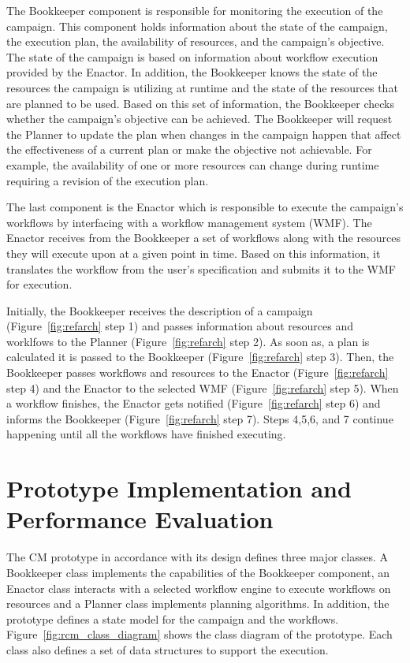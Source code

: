 The Bookkeeper component is responsible for monitoring the execution of the 
campaign. This component holds information about the state of the campaign, 
the execution plan, the availability of resources, and the campaign's 
objective. The state of the campaign is based on information about workflow 
execution provided by the Enactor. In addition, the Bookkeeper knows the state 
of the resources the campaign is utilizing at runtime and the state of the 
resources that are planned to be used. Based on this set of information, the 
Bookkeeper checks whether the campaign's objective can be achieved. The 
Bookkeeper will request the Planner to update the plan when changes in the 
campaign happen that affect the effectiveness of a current plan or make the 
objective not achievable. For example, the availability of one or more 
resources can change during runtime requiring a revision of the execution plan.

The last component is the Enactor which is responsible to execute the 
campaign's workflows by interfacing with a workflow management system (WMF).
The Enactor receives from the Bookkeeper a set of workflows along with the 
resources they will execute upon at a given point in time. Based on this 
information, it translates the workflow from the user's specification and 
submits it to the WMF for execution.

Initially, the Bookkeeper receives the description of a campaign 
(Figure~\ref{fig:refarch} step 1) and passes information about resources and 
worklfows to the Planner (Figure~\ref{fig:refarch} step 2). As soon as, a plan 
is calculated it is passed to the Bookkeeper (Figure~\ref{fig:refarch} step 3).
Then, the Bookkeeper passes workflows and resources to the Enactor 
(Figure~\ref{fig:refarch} step 4) and the Enactor to the selected WMF 
(Figure~\ref{fig:refarch} step 5). When a workflow finishes, the Enactor gets 
notified (Figure~\ref{fig:refarch} step 6) and informs the Bookkeeper 
(Figure~\ref{fig:refarch} step 7). Steps 4,5,6, and 7 continue happening until 
all the workflows have finished executing.

\section{Prototype Implementation and Performance Evaluation}
\label{sec:cm_impl}

The CM prototype in accordance with its design defines three 
major classes. A Bookkeeper class implements the capabilities of the 
Bookkeeper component, an Enactor class interacts with a selected workflow 
engine to execute workflows on resources and a Planner class implements 
planning algorithms. In addition, the prototype defines a state model for the 
campaign and the workflows. Figure~\ref{fig:rcm_class_diagram} shows the class 
diagram of the prototype. Each class also defines a set of data structures to 
support the execution. 

